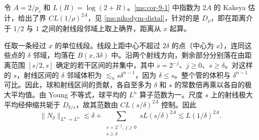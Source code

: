 令 \(A=2/p_c\) 和 \(L(R)=\log(2+R)\)。\ref{ms:cor-9-1} 中指数为 \(2A\) 的 Kakeya 估计，给出了界 \(C L(1/\rho)^{2A}\)，见 \ref{ms:nikodym-distal}，针对的是 \(D_\rho\)，即在距离介于 \(1/2\) 与 \(1\) 之间的射线段邻域上取上确界，距离从 \(x\) 起算。

任取一条经过 \(x\) 的单位线段。线段上距中心不超过 \(2\delta\) 的点（中心为 \(x\)），连同这些点的 \(\delta\) 邻域，均落在 \(B(x,3\delta)\) 中。沿两个射线方向，剩余部分分别落在由距离范围 \([s/2,s]\) 确定的若干区间的并集中，其中 \(s=2^{-j}\)、\(j\ge0\)、\(s\ge\delta\)。对这样的 \(s\)，射线区间的 \(\delta\) 邻域体积为 \(\lesssim_n s\delta^{n-1}\)，因为 \(\delta\le s\)。整个管的体积与 \(\delta^{n-1}\) 可比。因此，球和射线区间的贡献，各自至多为 \(\delta\) 和 \(s\) 的常数倍再乘以各自的极大平均值。由 Young 不等式，球平均的 \(L^n\) 算子范数为一。尺度 \(s\) 上的射线极大平均经伸缩共轭于 \(D_{\delta/s}\)，故其范数由 \(C L(s/\delta)^{2A}\) 控制。因此
\[
 \|N_\delta\|_{L^n\to L^n}
 \lesssim \delta+\sum_{\substack{s=2^{-j},\ j\ge0\\ s\ge\delta}}sL(s/\delta)^{2A}
 \lesssim L(1/\delta)^{2A}.
\]
